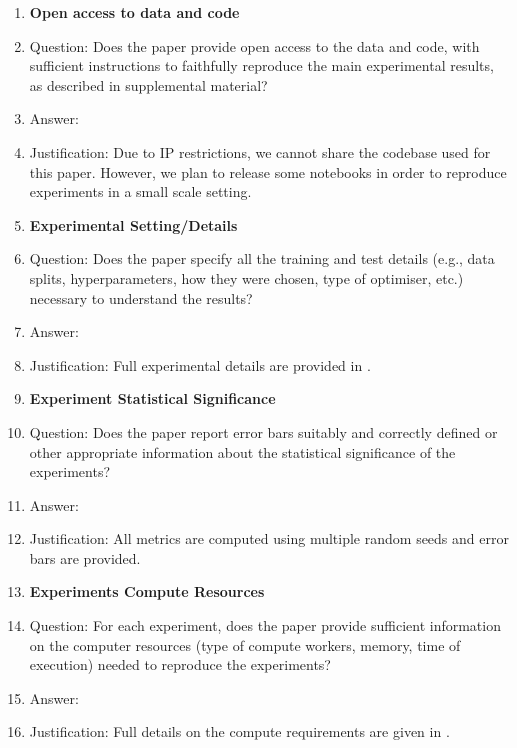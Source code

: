 \documentclass{article}
\begin{document}
\begin{enumerate}
\item {\bf Open access to data and code}
    \item[] Question: Does the paper provide open access to the data and code, with sufficient instructions to faithfully reproduce the main experimental results, as described in supplemental material?
    \item[] Answer: \answerNo{} %
    \item[] Justification: Due to IP restrictions, we cannot share the codebase used for this paper. However, we plan to release some notebooks in order to reproduce experiments in a small scale setting. 



\item {\bf Experimental Setting/Details}
    \item[] Question: Does the paper specify all the training and test details (e.g., data splits, hyperparameters, how they were chosen, type of optimiser, etc.) necessary to understand the results?
    \item[] Answer: \answerYes{} %
    \item[] Justification: Full experimental details are provided in .

\item {\bf Experiment Statistical Significance}
    \item[] Question: Does the paper report error bars suitably and correctly defined or other appropriate information about the statistical significance of the experiments?
    \item[] Answer: \answerYes{} %
    \item[] Justification: All metrics are computed using multiple random seeds and error bars are provided. 


\item {\bf Experiments Compute Resources}
    \item[] Question: For each experiment, does the paper provide sufficient information on the computer resources (type of compute workers, memory, time of execution) needed to reproduce the experiments?
    \item[] Answer: \answerYes{} %
    \item[] Justification: Full details on the compute requirements are given in .


\end{enumerate}
\end{document}
